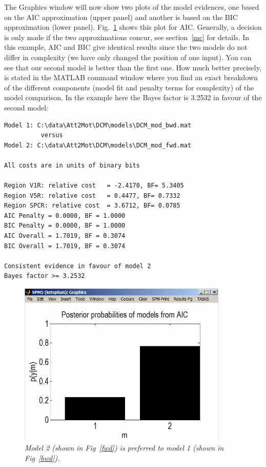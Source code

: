 The Graphics window will now show two plots of the model evidences, one based on the AIC approximation (upper panel) and another is based on the BIC approximation (lower panel).  Fig.~\ref{fig8} shows this plot for AIC.  Generally, a decision is only made if the two approximations concur, see section~\ref{mc} for details. In this example, AIC and BIC give identical results since the two models do not differ in complexity (we have only changed the position of one input). You can see that our second model is better than the first one. How much better precisely, is stated in the MATLAB command window where you find an exact breakdown of the different components (model fit and penalty terms for complexity) of the model comparison.  In the example here the Bayes factor is 3.2532 in favour of the second model:

\begin{verbatim}
Model 1: C:\data\Att2Mot\DCM\models\DCM_mod_bwd.mat
          versus 
Model 2: C:\data\Att2Mot\DCM\models\DCM_mod_fwd.mat
 
All costs are in units of binary bits
 
Region V1R: relative cost   = -2.4170, BF= 5.3405
Region V5R: relative cost   = 0.4477, BF= 0.7332
Region SPCR: relative cost  = 3.6712, BF= 0.0785
AIC Penalty = 0.0000, BF = 1.0000
BIC Penalty = 0.0000, BF = 1.0000
AIC Overall = 1.7019, BF = 0.3074
BIC Overall = 1.7019, BF = 0.3074
 
Consistent evidence in favour of model 2
Bayes factor >= 3.2532

\end{verbatim}

\begin{figure}[ht]
\begin{center}
\includegraphics[width=100mm]{dcm/Fig8}
\caption{\em Model 2 (shown in Fig~\ref{fwd}) is preferred to model 1 (shown in Fig~\ref{bwd}).\label{fig8}}
\end{center}
\end{figure}
